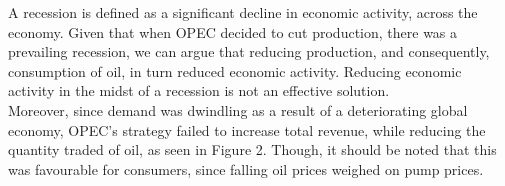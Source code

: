 \documentclass[12pt]{article}
\begin{document}
 A recession is defined as a significant decline in economic activity, across the economy. Given that when OPEC decided to cut production, there was a prevailing recession, we can argue that reducing production, and consequently, consumption of oil, in turn reduced economic activity. Reducing economic activity in the midst of a recession is not an effective solution.\\

Moreover, since demand was dwindling as a result of a deteriorating global economy, OPEC’s strategy failed to increase total revenue, while reducing the quantity traded of oil, as seen in Figure 2. Though, it should be noted that this was favourable for consumers, since falling oil prices weighed on pump prices.
\end{document}

